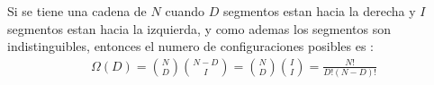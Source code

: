 \begin{answer}
    Si se tiene una cadena de $N$ cuando $D$ segmentos estan hacia la derecha y $I$ segmentos estan hacia la izquierda, y como ademas los segmentos
    son indistinguibles, entonces el numero de configuraciones posibles es :
    \begin{align*}
        \Omega(D) = \binom{N}{D}\binom{N-D}{I} = \binom{N}{D}\binom{I}{I} = \frac{N!}{D!(N-D)!}
    \end{align*}
\end{answer}